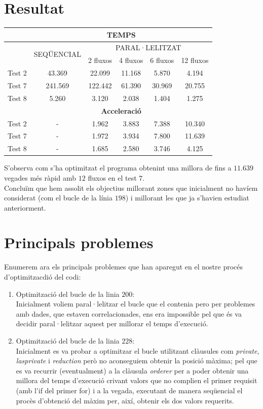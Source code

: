 \documentclass[a4paper, 11pt]{article}
\begin{document}
\section{Resultat}
\begin{table}[h]
  \centering
  \begin{tabular}{l||c||c|c|c|c}
        \multirow{3}{*}{\cellcolor{black}{}} & \multicolumn{5}{c}{\textbf{TEMPS}}\\\hline
        \cellcolor{black}{} & \multirow{2}{*}{SEQÜENCIAL} & \multicolumn{4}{c}{PARAL·LELITZAT}\\ 
        \cellcolor{black}{} &  & 2 fluxos & 4 fluxos & 6 fluxos & 12 fluxos\\\hline\hline
        Test 2 & 43.369 & 22.099 & 11.168 & 5.870 & 4.194 \\\hline
        Test 7 & 241.569 & 122.442 & 61.390 & 30.969 & 20.755\\\hline
        Test 8 & 5.260 & 3.120 & 2.038 & 1.404 & 1.275\\\hline\hline
        \cellcolor{black}{} & \multicolumn{5}{c}{\textbf{Acceleració}} \\\hline\hline
        Test 2 & - & 1.962 & 3.883 & 7.388 & 10.340 \\\hline
        Test 7 & - & 1.972 & 3.934 & 7.800 & 11.639\\\hline
        Test 8 & - & 1.685 & 2.580 & 3.746 & 4.125\\
    \end{tabular}
\end{table}
\hspace{-1.5 em}S'observa com s'ha optimitzat el programa obtenint una millora de fins a $11.639$ vegades més ràpid amb $12$ fluxos en el test $7$.\\
Concluïm que hem assolit els objectius millorant zones que inicialment no havíem considerat (com el bucle de la línia $198$) i millorant les que ja s'havien estudiat anteriorment.
\section{Principals problemes}
Enumerem ara els principals problemes que han aparegut en el nostre procés d'optimitzacdió del codi:
\begin{enumerate}
    \item Optimització del bucle de la linia $200$: \\
    Inicialment voliem paral·lelitzar el bucle que el contenia pero per problemes amb dades, que estaven correlacionades, ens era impossible pel que és va decidir paral·lelitzar aquest per millorar el temps d'execució.
    \item Optimització del bucle de la linia $228$:\\
    Inicialment es va probar a optimitzar el bucle utilitzant clàusules com \textit{private}, \textit{lasprivate} i \textit{reduction} però no aconseguiem obtenir la posició màxima; pel que es va recurrir (eventualment) a la clàusula \textit{orderer} per a poder obtenir una millora del temps d'execució crivant valors que no complien el primer requisit (amb l'if del primer for) i a la vegada, executant de manera seqüencial el procès d'obtenció del màxim per, així, obtenir els dos valors requerits.
\end{enumerate}
\end{document}
